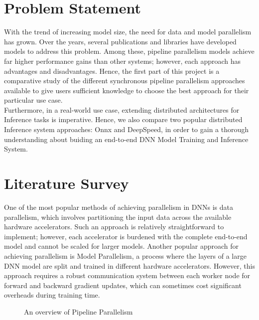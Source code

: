 \documentclass[conference]{IEEEtran}
\begin{document}
\section{Problem Statement}
With the trend of increasing model size, the need for data and model parallelism has grown. Over the years, several publications and libraries have developed models to address this problem. Among these, pipeline parallelism models achieve far higher performance gains than other systems; however, each approach has advantages and disadvantages. Hence, the first part of this project is a comparative study of the different synchronous pipeline parallelism approaches available to give users sufficient knowledge to choose the best approach for their particular use case. \\

Furthermore, in a real-world use case, extending distributed architectures for Inference tasks is imperative. Hence, we also compare two popular distributed Inference system approaches: Onnx and DeepSpeed, in order to gain a thorough understanding about buiding an end-to-end DNN Model Training and Inference System. \\

\section{Literature Survey}
One of the most popular methods of achieving parallelism in DNNs is data parallelism, which involves partitioning the input data across the available hardware accelerators. Such an approach is relatively straightforward to implement; however, each accelerator is burdened with the complete end-to-end model and cannot be scaled for larger models. Another popular approach for achieving parallelism is Model Parallelism, a process where the layers of a large DNN model are split and trained in different hardware accelerators. However, this approach requires a robust communication system between each worker node for forward and backward gradient updates, which can sometimes cost significant overheads during training time. \\

\begin{figure}
	\centering
	\caption{An overview of Pipeline Parallelism}
	\label{fig}
\end{figure}
\end{document}
